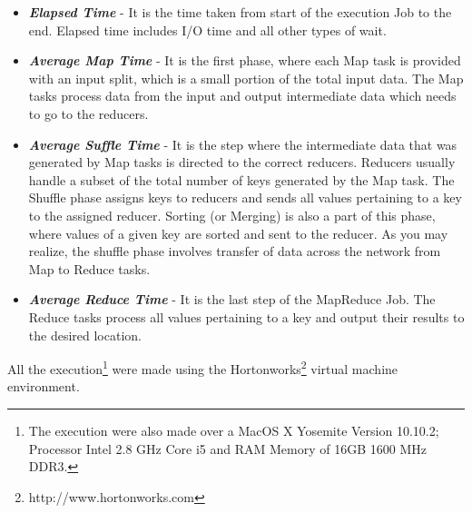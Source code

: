 \begin{itemize}
  \item \textbf{\textit{Elapsed Time}} -  It is the time taken from start of
  the execution Job to the end. Elapsed time includes I/O time and all
  other types of wait.
  \item \textbf{\textit{Average Map Time}} - It is the first phase, where each Map task is provided
  with an input split, which is a small portion of the total input data. The Map
  tasks process data from the input and output intermediate data which
  needs to go to the reducers.
  \item \textbf{\textit{Average Suffle Time}} - It is the step where the
  intermediate data that was generated by Map tasks is directed to the correct reducers. Reducers usually handle a
  subset of the total number of keys generated by the Map task. The Shuffle
  phase assigns keys to reducers and sends all values pertaining to a key to the
  assigned reducer. Sorting (or Merging) is also a part of this phase, where
  values of a given key are sorted and sent to the reducer. As you may realize,
  the shuffle phase involves transfer of data across the network from Map to
  Reduce tasks.       
  \item \textbf{\textit{Average Reduce Time}} - It is the last step of the
  MapReduce Job. The Reduce tasks process all values pertaining to a key and
  output their results to the desired location. 
\end{itemize}

All the execution\footnote{The execution were also made over a MacOS X Yosemite
Version 10.10.2; Processor Intel 2.8 GHz Core i5 and RAM Memory of 16GB 1600 MHz
DDR3.} were made using the Hortonworks\footnote{http://www.hortonworks.com}
virtual machine environment. 

